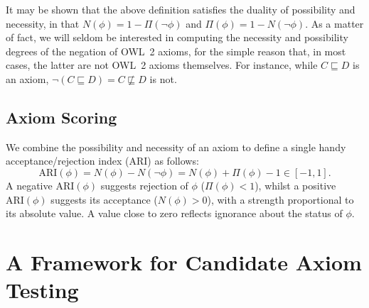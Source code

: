 \documentclass[conference]{IEEEtran}
\begin{document}
It may be shown that the above definition satisfies the duality of
possibility and necessity, in that $N(\phi) = 1 - \Pi(\neg\phi)$ and
$\Pi(\phi) = 1 - N(\neg\phi)$.
As a matter of fact, we will seldom be interested in computing the necessity and
possibility degrees of the negation of OWL~2 axioms, for the simple reason that, in most cases,
the latter are not OWL~2 axioms themselves. For instance, while $C \sqsubseteq D$
is an axiom, $\neg(C \sqsubseteq D) = C \not\sqsubseteq D$ is not.



\subsection{Axiom Scoring}
We combine the possibility and necessity of an axiom to define
a single handy acceptance/rejection index (ARI) as follows:
\begin{equation}\label{eq:ARI}
  \mathrm{ARI}(\phi) = N(\phi) - N(\neg\phi) = N(\phi) + \Pi(\phi) - 1 \in [-1, 1].
\end{equation}
A negative $\mathrm{ARI}(\phi)$ suggests rejection of $\phi$ ($\Pi(\phi)<1$),
whilst a positive $\mathrm{ARI}(\phi)$ suggests its acceptance ($N(\phi)>0$),
with a strength proportional to its absolute value. A value close to zero
reflects ignorance about the status of $\phi$.

\section{A Framework for Candidate Axiom Testing}
\label{OWL2SPARQL} 
\end{document}
